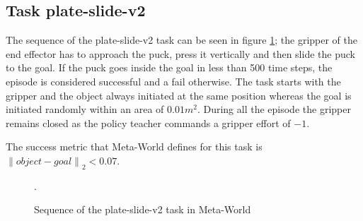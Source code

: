 \subsection{Task plate-slide-v2}
\label{subsection:metaworld-hockey-task}

The sequence of the plate-slide-v2 task can be seen in figure \ref{fig:sequence-plate-slide}; the gripper of the end effector has to approach the puck, press it vertically and then slide the puck to the goal. If the puck goes inside the goal in less than 500 time steps, the episode is considered successful and a fail otherwise. The task starts with the gripper and the object always initiated at the same position whereas the goal is initiated randomly within an area of  $0.01m^2$. During all the episode the gripper remains closed as the policy teacher commands a gripper effort of $-1$.


The success metric that Meta-World defines for this task is ${\left\lVert object-goal \right\rVert}_2 < 0.07$.

 \begin{figure}[H]
  \centering
  \hspace*{\fill}%
   \hfill
   \hfill
  \hspace*{\fill}%
  \caption{Sequence of the plate-slide-v2 task in Meta-World}.
  \label{fig:sequence-plate-slide}
\end{figure}


